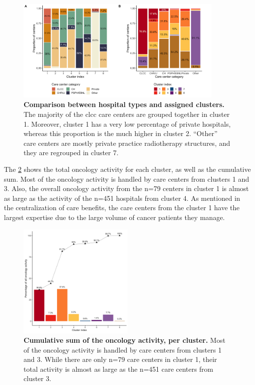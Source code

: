 \begin{figure}[h]
    \includegraphics[width=0.9\textwidth]{images/camion/supplemental/sup_fig2_categories_per_cluster.png}
    \centering
    \caption{ \textbf{Comparison between hospital types and assigned clusters.}
        The majority of the \ac{clcc} care centers are grouped together in
        cluster 1. Moreover, cluster 1 has a very low percentage of private
        hospitals, whereas this proportion is the much higher in cluster 2.
        “Other” care centers are mostly private practice radiotherapy
        structures, and they are regrouped in cluster 7. }
    \label{fig:clustering-categories}
\end{figure}

The \cref{fig:clustering-cumulative} shows the total oncology activity for each
cluster, as well as the cumulative sum. Most of the oncology activity is handled
by care centers from clusters 1 and 3. Also, the overall oncology activity from
the n=79 centers in cluster 1 is almost as large as the activity of the n=451
hospitals from cluster 4. As mentioned in the centralization of care benefits,
the care centers from the cluster 1 have the largest expertise due to the
large volume of cancer patients they manage.

\begin{figure}[H]
    \includegraphics[width=0.5\textwidth]{images/camion/supplemental/sup_fig3_nb_stays_per_cluster.png}
    \centering
    \caption{ \textbf{Cumulative sum of the oncology activity, per cluster.}
        Most of the oncology activity is handled by care centers from clusters 1
        and 3. While there are only n=79 care centers in cluster 1, their total
        activity is almost as large as the n=451 care centers from cluster 3. }
    \label{fig:clustering-cumulative}
\end{figure}

